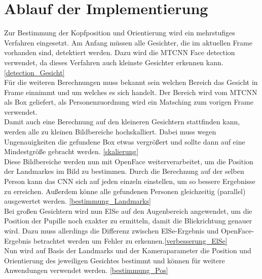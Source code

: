 \section{Ablauf der Implementierung}
Zur Bestimmung der Kopfposition und Orientierung wird ein mehrstufiges Verfahren eingesetzt. Am Anfang müssen alle Gesichter, die im aktuellen Frame vorhanden sind, detektiert werden. Dazu wird die MTCNN Face detection verwendet, da dieses Verfahren auch kleinste Gesichter erkennen kann. \ref{detection_Gesicht}\\
Für die weiteren Berechnungen muss bekannt sein welchen Bereich das Gesicht in Frame einnimmt und um welches es sich handelt. Der Bereich wird vom MTCNN als Box geliefert, als Personenzuordnung wird ein Matsching zum vorigen Frame verwendet.\\
Damit auch eine Berechnung auf den kleineren Gesichtern stattfinden kann, werden alle zu kleinen Bildbereiche hochskalliert. Dabei muss wegen Ungenauigkeiten die gefundene Box etwas vergrößert und sollte dann auf eine Mindestgröße gebracht werden. \ref{skalierung}\\
Diese Bildbereiche werden nun mit OpenFace weiterverarbeitet, um die Position der Landmarkes im Bild zu bestimmen. Durch die Berechnung auf der selben Person kann das CNN sich auf jeden einzeln einstellen, um so bessere Ergebnisse zu erreichen. Außerdem könne alle gefundenen Personen gleichzeitig (parallel) ausgewertet werden. \ref{bestimmung_Landmarks}\\
Bei großen Gesichtern wird nun ElSe auf den Augenbereich angewendet, um die Position der Pupille noch exakter zu ermitteln, damit die Blickrichtung genauer wird. Dazu muss allerdings die Differenz zwischen ElSe-Ergebnis und OpenFace-Ergebnis betrachtet werden um Fehler zu erkennen.\ref{verbesserung_ElSe}\\
Nun wird auf Basis der Landmarks und der Kameraparameter die Position und Orientierung des jeweiligen Gesichtes bestimmt und können für weitere Anwendungen verwendet werden. \ref{bestimmung_Pos}